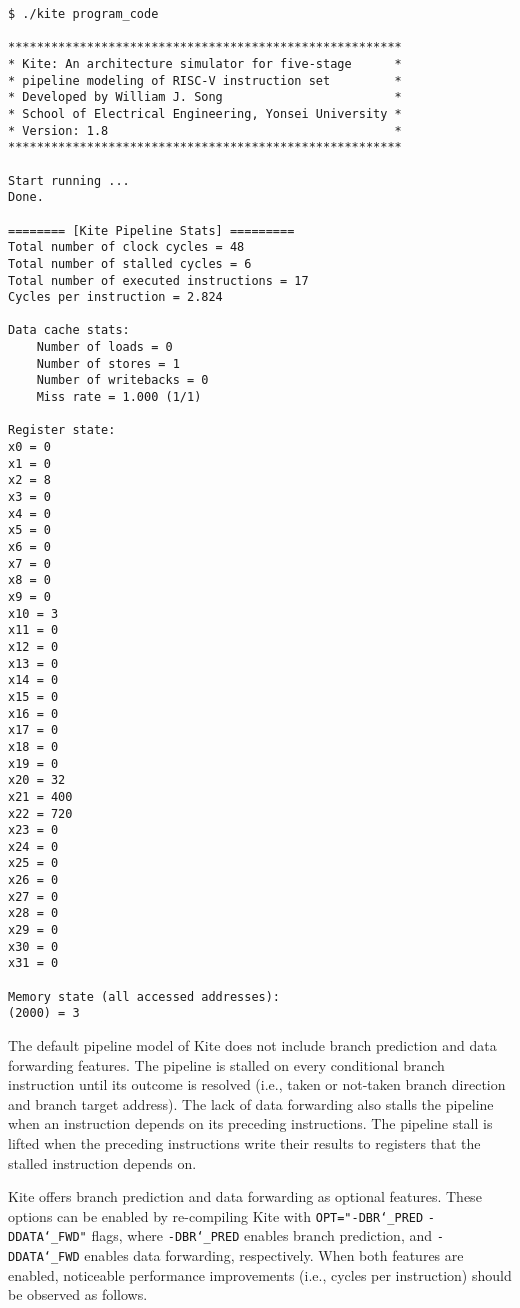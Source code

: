 \documentclass[10pt]{article}
\begin{document}
\begin{Verbatim}[frame=single,fontsize=\small]
$ ./kite program_code

*******************************************************
* Kite: An architecture simulator for five-stage      *
* pipeline modeling of RISC-V instruction set         *
* Developed by William J. Song                        *
* School of Electrical Engineering, Yonsei University *
* Version: 1.8                                        *
*******************************************************

Start running ...
Done.

======== [Kite Pipeline Stats] =========
Total number of clock cycles = 48
Total number of stalled cycles = 6
Total number of executed instructions = 17
Cycles per instruction = 2.824

Data cache stats:
    Number of loads = 0
    Number of stores = 1
    Number of writebacks = 0
    Miss rate = 1.000 (1/1)

Register state:
x0 = 0
x1 = 0
x2 = 8
x3 = 0
x4 = 0
x5 = 0
x6 = 0
x7 = 0
x8 = 0
x9 = 0
x10 = 3
x11 = 0
x12 = 0
x13 = 0
x14 = 0
x15 = 0
x16 = 0
x17 = 0
x18 = 0
x19 = 0
x20 = 32
x21 = 400
x22 = 720
x23 = 0
x24 = 0
x25 = 0
x26 = 0
x27 = 0
x28 = 0
x29 = 0
x30 = 0
x31 = 0

Memory state (all accessed addresses):
(2000) = 3
\end{Verbatim}

The default pipeline model of Kite does not include branch prediction and data forwarding features.
The pipeline is stalled on every conditional branch instruction until its outcome is resolved (i.e., taken or not-taken branch direction and branch target address).
The lack of data forwarding also stalls the pipeline when an instruction depends on its preceding instructions.
The pipeline stall is lifted when the preceding instructions write their results to registers that the stalled instruction depends on.

Kite offers branch prediction and data forwarding as optional features.
These options can be enabled by re-compiling Kite with {\tt OPT="-DBR\char`_PRED} {\tt -DDATA\char`_FWD"} flags, where {\tt -DBR\char`_PRED} enables branch prediction, and {\tt -DDATA\char`_FWD} enables data forwarding, respectively.
When both features are enabled, noticeable performance improvements (i.e., cycles per instruction) should be observed as follows.
\end{document}
